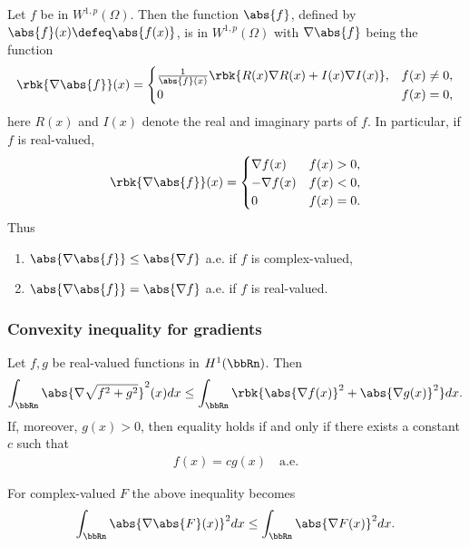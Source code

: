 \documentclass[openany, a4paper, oneside]{jsbook}
\begin{document}
\begin{thm}\label{Lieb-Loss_Analysis_chap11_11}
 Let $f$ be in $W^{1,p} (\Omega)$.
 Then the function $\abs{f}$, defined by $\abs{f}(x) \defeq \abs{f (x)}$, is in $W^{1,p} (\Omega)$ with $\nabla \abs{f}$ being the function
\begin{align}
 \rbk{\nabla \abs{f}}(x)
 =
 \begin{cases}
  \frac{1}{\abs{f}(x)} \rbk{R (x) \nabla R (x) + I (x) \nabla I (x)}, &f (x) \neq 0, \\
  0 & f (x) = 0,
 \end{cases}
\end{align}
here $R (x)$ and $I (x)$ denote the real and imaginary parts of $f$.
In particular, if $f$ is real-valued,
\begin{align}
 \rbk{\nabla \abs{f}}(x)
 =
 \begin{cases}
  \nabla f (x) & f (x) > 0, \\
  -\nabla f (x) & f (x) < 0, \\
  0 & f (x) = 0.
 \end{cases}
\end{align}
Thus
\begin{enumerate}
\item $\abs{\nabla \abs{f}} \leq \abs{\nabla f}$ a.e. if $f$ is complex-valued,
\item $\abs{\nabla \abs{f}} = \abs{\nabla f}$ a.e. if $f$ is real-valued.
\end{enumerate}
\end{thm}
\subsubsection{Convexity inequality for gradients}

\begin{thm}\label{Lieb-Loss_Analysis_chap11_12}
 Let $f, g$ be real-valued functions in $H^1 (\bbRn)$.
 Then
\begin{align}
 \int_{\bbRn} \abs{\nabla \sqrt{f^2 + g^2}}^2 (x) dx
 \leq
 \int_{\bbRn} \rbk{ \abs{\nabla f (x)}^2 + \abs{\nabla g (x)}^2 } dx.
\end{align}
If, moreover, $g (x) > 0$, then equality holds if and only if there exists a constant $c$ such that
\begin{align}
 f (x) = c g (x) \quad \mathrm{a.e.}
\end{align}
\end{thm}
\begin{rem}
 For complex-valued $F$ the above inequality becomes
 \begin{align}
  \int_{\bbRn} \abs{\nabla \abs{F} (x)}^2 dx
  \leq
  \int_{\bbRn} \abs{\nabla F (x)}^2 dx.
 \end{align}
\end{rem}
\end{document}
